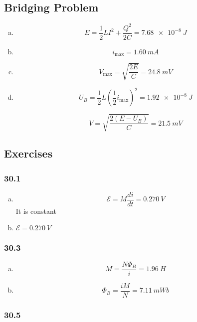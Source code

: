 \documentclass{article}
\begin{document}
\subsection{Bridging Problem}

\begin{enumerate}[(a)]
  \item \[E = \frac{1}{2} L I^2 + \frac{Q^2}{2 C} = \qty{7.68e-8}{J}\]

  \item \[i_\text{max} = \qty{1.60}{mA}\]

  \item \[V_\text{max} = \sqrt{\frac{2 E}{C}} = \qty{24.8}{mV}\]

  \item

        \[U_B = \frac{1}{2} L \left( \frac{1}{2} i_\text{max} \right)^2 = \qty{1.92e-8}{J}\]

        \[V = \sqrt{\frac{2 (E - U_B)}{C}} = \qty{21.5}{mV}\]
\end{enumerate}

\subsection{Exercises}

\subsubsection{30.1}

\begin{enumerate}[(a)]
  \item \[\mathcal{E} = M \frac{di}{dt} = \qty{0.270}{V}\] It is constant

  \item $\mathcal{E} = \qty{0.270}{V}$
\end{enumerate}

\subsubsection{30.3}

\begin{enumerate}[(a)]
  \item \[M = \frac{N \Phi_B}{i} = \qty{1.96}{H}\]

  \item \[\Phi_B = \frac{i M}{N} = \qty{7.11}{mWb}\]
\end{enumerate}

\subsubsection{30.5}
\end{document}
